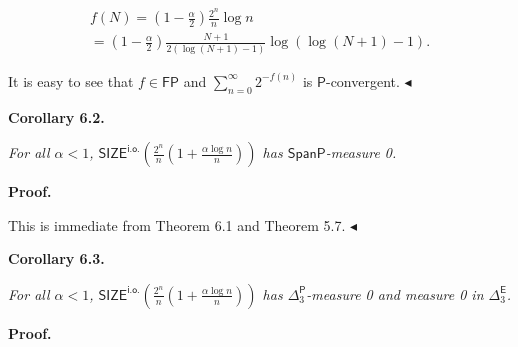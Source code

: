 \[\begin{gathered}
\displaystyle f(N) \displaystyle= \displaystyle\left(1-\frac{\alpha}{2}\right)\frac{2^{n}}{n}\log n \\
\displaystyle= \displaystyle\left(1-\frac{\alpha}{2}\right)\frac{N+1}{2(\log\left(N+1\right)-1)}\log\left(\log\left(N+1\right)-1\right).
\end{gathered}\]


It is easy to see that $f\in\mathsf{FP}$ and $\sum_{n=0}^{\infty}2^{-f(n)}$ is $\mathsf{P}$-convergent.
$\blacktriangleleft$\par





\par\medskip\noindent\textbf{
\textbf{Corollary 6.2}\textbf{.}
}\par



\emph{For all $\alpha<1$,
$\mathsf{SIZE}^{\mathsf{i.o.}}\!\!\left(\frac{2^{n}}{n}\left(1+\frac{\alpha\log
n}{n}\right)\right)$
has $\mathsf{SpanP}$-measure 0.}\par







\par\medskip\noindent\textbf{Proof.}\par




This is immediate from Theorem 6.1 and Theorem 5.7.
$\blacktriangleleft$\par





\par\medskip\noindent\textbf{
\textbf{Corollary 6.3}\textbf{.}
}\par



\emph{For all $\alpha<1$,
$\mathsf{SIZE}^{\mathsf{i.o.}}\!\!\left(\frac{2^{n}}{n}\left(1+\frac{\alpha\log
n}{n}\right)\right)$
has ${\Delta^{\mathsf{P}}_{3}}$-measure 0 and measure 0 in $\Delta^{\mathsf{E}}_{3}$.}\par







\par\medskip\noindent\textbf{Proof.}\par




